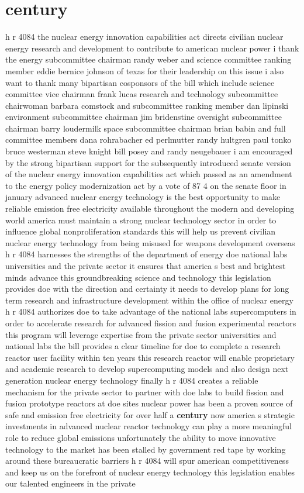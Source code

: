 \documentclass{article}
\begin{document}
\section*{century}
h r 4084 the nuclear energy innovation capabilities act directs civilian nuclear energy research and development to contribute to american nuclear power i thank the energy subcommittee chairman randy weber and science committee ranking member eddie bernice johnson of texas for their leadership on this issue i also want to thank many bipartisan cosponsors of the bill which include science committee vice chairman frank lucas research and technology subcommittee chairwoman barbara comstock and subcommittee ranking member dan lipinski environment subcommittee chairman jim bridenstine oversight subcommittee chairman barry loudermilk space subcommittee chairman brian babin and full committee members dana rohrabacher ed perlmutter randy hultgren paul tonko bruce westerman steve knight bill posey and randy neugebauer i am encouraged by the strong bipartisan support for the subsequently introduced senate version of the nuclear energy innovation capabilities act which passed as an amendment to the energy policy modernization act by a vote of 87 4 on the senate floor in january advanced nuclear energy technology is the best opportunity to make reliable emission free electricity available throughout the modern and developing world america must maintain a strong nuclear technology sector in order to influence global nonproliferation standards this will help us prevent civilian nuclear energy technology from being misused for weapons development overseas h r 4084 harnesses the strengths of the department of energy doe national labs universities and the private sector it ensures that america s best and brightest minds advance this groundbreaking science and technology this legislation provides doe with the direction and certainty it needs to develop plans for long term research and infrastructure development within the office of nuclear energy h r 4084 authorizes doe to take advantage of the national labs supercomputers in order to accelerate research for advanced fission and fusion experimental reactors this program will leverage expertise from the private sector universities and national labs the bill provides a clear timeline for doe to complete a research reactor user facility within ten years this research reactor will enable proprietary and academic research to develop supercomputing models and also design next generation nuclear energy technology finally h r 4084 creates a reliable mechanism for the private sector to partner with doe labs to build fission and fusion prototype reactors at doe sites nuclear power has been a proven source of safe and emission free electricity for over half a {\bf \color{red} century} now america s strategic investments in advanced nuclear reactor technology can play a more meaningful role to reduce global emissions unfortunately the ability to move innovative technology to the market has been stalled by government red tape by working around these bureaucratic barriers h r 4084 will spur american competitiveness and keep us on the forefront of nuclear energy technology this legislation enables our talented engineers in the private 
\end{document}
